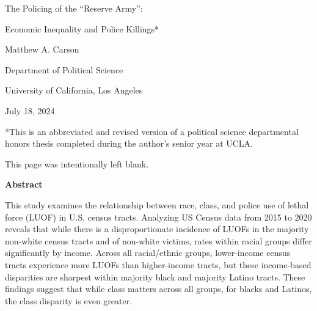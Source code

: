 \documentclass[12pt]{article}
\renewcommand{\headrulewidth}{1pt} %
\renewenvironment{abstract}
  {\par\noindent\centering\textbf{Abstract}\par}
  {\noindent\raggedright}
\begin{document}
\begin{titlepage}
  \thispagestyle{fancy}
  \renewcommand{\headrulewidth}{0pt} %
  {
  \centering
  \vspace*{2in}
  The Policing of the ``Reserve Army'':\par
  Economic Inequality and Police Killings*\par
  \vspace{1.2in}
  {Matthew A. Carson\par}
  \vspace{12pt}
  Department of Political Science\par
  University of California, Los Angeles\par
  \vspace{0.5in}
  {July 18, 2024\par}
  }
 \vfill
 \noindent{}*This is an abbreviated and revised version of a political science departmental honors thesis completed during the author's senior year at UCLA.
 \vspace{6pt}
\end{titlepage}

\thispagestyle{empty} %

\vspace*{\fill}
\hspace*{\fill}
\begin{center}
    \noindent{}This page was intentionally left blank.
\end{center}
\hspace*{\fill}
\vspace*{\fill}

\clearpage

\begin{abstract}
This study examines the relationship between race, class, and police use of lethal force (LUOF) in U.S. census tracts. Analyzing US Census data from 2015 to 2020 reveals that while there is a disproportionate incidence of LUOFs in the majority non-white census tracts and of non-white victims, rates within racial groups differ significantly by income. Across all racial/ethnic groups, lower-income census tracts experience more LUOFs than higher-income tracts, but these income-based disparities are sharpest within majority black and majority Latino tracts. These findings suggest that while class matters across all groups, for blacks and Latinos, the class disparity is even greater.
\end{abstract}
\end{document}
